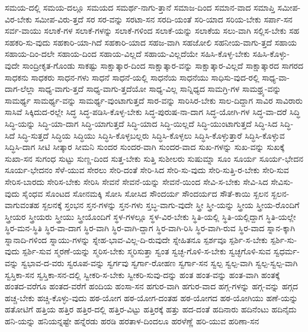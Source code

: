 {ಸಮಯ-ದಲ್ಲಿ
ಸಮಯ-ದಲ್ಲೂ
ಸಮಯದ
ಸಮರ್ಥ-ನಾಗು-ತ್ತಾನೆ
ಸಮಾಜ-ದಿಂದ
ಸಮಾನ-ವಾದ
ಸಮಾಪ್ತಿ
ಸಮೀಪ-ವಿರ-ಬೇಕು
ಸಮೀಪ-ವಿರು-ತ್ತದೆ
ಸರ
ಸರ-ವನ್ನು
ಸರಟಾ-ಸನ
ಸರದಿ-ಯಂತೆ
ಸರಿ-ಯಾದ
ಸರಿಯ-ಬೇಕು
ಸರ್ಪಾ-ಸನ
ಸರ್ವ-ವಾಯು
ಸಲಾಕೆ-ಗಳ
ಸಲಾಕೆ-ಗಳನ್ನು
ಸಲಾಕೆ-ಗಳಿಂದ
ಸಲಾಕೆ-ಯನ್ನು
ಸಲಾಕೆಯ
ಸಲು-ವಾಗಿ
ಸಲ್ಲಿಸ-ಬೇಕು
ಸಹ
ಸಹಕರಿ-ಸು-ವುದು
ಸಹಕಾರಿ-ಯಾ-ಗಿದೆ
ಸಹಕಾರಿ-ಯಾದ
ಸಹಜ-ವಾಗಿ
ಸಹಜೋಲಿ
ಸಹನೀಯ-ವಾಗು-ತ್ತದೆ
ಸಹಾಯ
ಸಹಾಯ-ದಿಂ-ದಲೇ
ಸಹಾಯ-ದಿಂದ
ಸಹಾಯ-ವಿಲ್ಲದೆ
ಸಹಾಯ-ವಿಲ್ಲದೆಯೇ
ಸಹಿಸಿ-ಕೊಳ್ಳ-ಬೇಕು
ಸಹಿಸಿ-ಕೊಳ್ಳು-ವುದೇ
ಸಾಂದ್ರೀಕೃತ-ಗೊಂಡು
ಸಾಕಷ್ಟು
ಸಾಕ್ಷಾತ್ಕಾರ-ದಿಂದ
ಸಾಕ್ಷಾತ್ಕಾರ-ವನ್ನು
ಸಾಕ್ಷಾತ್ಕಾರ-ವಿಲ್ಲದೆ
ಸಾಕ್ಷಾತ್ಕಾರದ
ಸಾಗರದ
ಸಾಧಕನು
ಸಾಧಕರು
ಸಾಧನ-ಗಳು
ಸಾಧನೆ
ಸಾಧನೆ-ಯಲ್ಲಿ
ಸಾಧನೆಯ
ಸಾಧನೆಯು
ಸಾಧಿಸು-ವುದ-ರಲ್ಲಿ
ಸಾಧ್ಯ-ವಾ-ದಾಗ-ಲೆಲ್ಲಾ
ಸಾಧ್ಯ-ವಾಗು-ತ್ತದೆ
ಸಾಧ್ಯ-ವಾಗು-ತ್ತದೆಯೋ
ಸಾಧ್ಯ-ವಿಲ್ಲ
ಸಾನ್ನಿಧ್ಯದ
ಸಾಮಗ್ರಿ-ಗಳ
ಸಾಮಥ್ರ್ಯ-ವನ್ನು
ಸಾಮರ್ಥ್ಯ
ಸಾಮರ್ಥ್ಯ-ವನ್ನು
ಸಾಮರ್ಥ್ಯ-ವುಂಟಾಗುತ್ತದೆ
ಸಾರ-ವನ್ನು
ಸಾರಿಸಿರ-ಬೇಕು
ಸಾಲ-ದಿದ್ದಾಗ
ಸಾವಿರ
ಸಾವಿರಾರು
ಸಾಸಿವೆ
ಸಿಕ್ಕಿದುದ-ರಲ್ಲೇ
ಸಿದ್ಧ
ಸಿದ್ಧ-ಪಡಿಸಿ-ಕೊಳ್ಳ-ಬೇಕು
ಸಿದ್ಧ-ಪುರುಷ-ನಾ-ದಾಗ
ಸಿದ್ಧ-ಯೋಗಿ-ಗಳ
ಸಿದ್ಧ-ವಾ-ದರೆ
ಸಿದ್ಧಿ
ಸಿದ್ಧಿ-ಯನ್ನು
ಸಿದ್ಧಿ-ಯಾ-ದಾಗ
ಸಿದ್ಧಿ-ಯಾಗುತ್ತದೆ
ಸಿದ್ಧಿ-ಯಾದ
ಸಿದ್ಧಿ-ಯಿಲ್ಲದೆ
ಸಿದ್ಧಿ-ಯುಂಟಾಗುತ್ತದೆ
ಸಿದ್ಧಿ-ಸಿದ
ಸಿದ್ಧಿ-ಸಿದೆ
ಸಿದ್ಧಿ-ಸುತ್ತದೆ
ಸಿದ್ಧಿಯ
ಸಿದ್ಧಿಯು
ಸಿದ್ಧಿಸಿ-ಕೊಳ್ಳಬಲ್ಲರು
ಸಿದ್ಧಿಸಿ-ಕೊಳ್ಳಲು
ಸಿದ್ಧಿಸಿ-ಕೊಳ್ಳುತ್ತಾರೆ
ಸಿದ್ಧಿಸಿ-ಕೊಳ್ಳುವ
ಸಿದ್ಧಿಸಿ-ದಾಗ
ಸೀಟಿ
ಸೀತ್ಕಾರ
ಸೀಮನಿ
ಸುಂದರ
ಸುಂದರ-ವಾಗಿ
ಸುಂದರ-ವಾದ
ಸುಖ-ಗಳನ್ನು
ಸುಖ-ವನ್ನು
ಸುಖಕ್ಕೆ
ಸುಖಾ-ಸನ
ಸುಗಂಧ
ಸುಟ್ಟು
ಸುಣ್ಣ-ದಿಂದ
ಸುತ್ತ-ಬೇಕು
ಸುತ್ತಿ
ಸುಶೀಲರು
ಸುಷುಮ್ನಾ
ಸೂಂ
ಸೂರ್ಯ
ಸೂರ್ಯ-ಭೇದನ
ಸೂರ್ಯ-ಭೇದನಂ
ಸೆಳೆ-ಯುವ
ಸೇರಲು
ಸೇರಿ-ದಂತೆ
ಸೇರಿ-ಸಿದ
ಸೇರಿ-ಸು-ವುದು
ಸೇರಿ-ಸುತ್ತಿ-ರ-ಬೇಕು
ಸೇರಿ-ಸುವ
ಸೇರಿಸ-ಬಾರದು
ಸೇರಿಸ-ಬೇಕು
ಸೇರಿಸಿ
ಸೇವನೆ
ಸೇವನೆ-ಯನ್ನು
ಸೇವನೆ-ಯಿಂದ
ಸೇವಿ-ಸ-ಬೇಕು
ಸೇವಿ-ಸಿದ
ಸೇವಿಸು-ವುದು
ಸೈಂಧವ
ಸೊಂಟದ
ಸೋನಮಕ್ಕಿ
ಸೋಸಿ
ಸೋಸಿದ
ಸೌಂದರ್ಯ
ಸೌಂದರ್ಯದ
ಸೌತೆ-ಕಾಯಿ
ಸ್ಖಲನ
ಸ್ಖಲನ-ವಾಗುವಂತಹ
ಸ್ಖಲನಕ್ಕೆ
ಸ್ತಂಭನ
ಸ್ತನ-ಗಳನ್ನು
ಸ್ತನ-ಗಳು
ಸ್ತಬ್ಧ-ವಾಗು-ವುದೇ
ಸ್ತ್ರೀ
ಸ್ತ್ರೀ-ಯನ್ನು
ಸ್ತ್ರೀಯ
ಸ್ತ್ರೀಯ-ರೊಂದಿಗೆ
ಸ್ತ್ರೀಯರ
ಸ್ತ್ರೀಯರು
ಸ್ತ್ರೀಯು
ಸ್ತ್ರೀಯೊಂದಿಗೆ
ಸ್ಥಳ-ಗಳಲ್ಲೂ
ಸ್ಥಳ-ವಿರ-ಬೇಕು
ಸ್ಥಿತಿ-ಯಲ್ಲಿ
ಸ್ಥಿತಿ-ಯಲ್ಲಿದ್ದಾಗ
ಸ್ಥಿತಿ-ಯಲ್ಲೇ
ಸ್ಥಿರ-ಮನ-ಸ್ಥಿತಿ
ಸ್ಥಿರ-ವಾ-ದಾಗ
ಸ್ಥಿರ-ವಾಗಿ
ಸ್ಥಿರ-ವಾಗಿ-ದ್ದಾಗ
ಸ್ಥಿರ-ವಾಗಿ-ರಿಸಿ
ಸ್ಥಿರ-ವಾಗಿ-ರುವ
ಸ್ಥಿರ-ವಾದ
ಸ್ನಾನ-ಕ್ಕಾಗಿ
ಸ್ನಾನಾದಿ-ಗಳಿಂದ
ಸ್ನಾಯು-ಗಳನ್ನು
ಸ್ನೇಹ-ಭಾವ-ವಿಲ್ಲ-ದಿ-ರುವುದೇ
ಸ್ನೇಹಿತನೂ
ಸ್ಪರ್ಶವೂ
ಸ್ಪರ್ಶಿ-ಸ-ಬೇಕು
ಸ್ಪರ್ಶಿ-ಸು-ವುದು
ಸ್ಪರ್ಶಿ-ಸುವ
ಸ್ಮರಣೆ-ಯನ್ನು
ಸ್ಮರಿಸ-ಬೇಕು
ಸ್ಮರಿಸುತ್ತಾ
ಸ್ವಂತ
ಸ್ವಚ್ಛ-ಗೊಳಿ-ಸ-ಬೇಕು
ಸ್ವಚ್ಛಗೊಳಿ-ಸುವ
ಸ್ವಧರ್ಮ-ವನ್ನು
ಸ್ವಭಾವ-ದ-ವರು
ಸ್ವರೂಪ-ವನ್ನು
ಸ್ವರ್ಗವು
ಸ್ವರ್ಗಾ-ರೋಹಣ
ಸ್ವರ್ಗಾ-ಸನ
ಸ್ವಲ್ಪ
ಸ್ವಲ್ಪ-ವಾಗಿ
ಸ್ವಲ್ಪ-ಸ್ವಲ್ಪ-ವಾಗಿ
ಸ್ವಸ್ತಿಕಾ-ಸನ
ಸ್ವಸ್ತಿಕಾ-ಸನ-ದಲ್ಲಿ
ಸ್ವೀಕರಿ-ಸ-ಬೇಕು
ಸ್ವೀಕರಿ-ಸುವು-ದನ್ನು
ಹಂತ
ಹಂತ-ವನ್ನು
ಹಂತ-ವಾಗಿ
ಹಂತಕ್ಕೆ
ಹಂತದ-ವರೆಗೂ
ಹಂತದ-ವರೆಗೆ
ಹಂದಿಯ
ಹಂಸಾ-ಸನ
ಹಗುರ-ವಾಗಿ
ಹಗುರ-ವಾದ
ಹಗ್ಗ-ಗಳನ್ನು
ಹಗ್ಗ-ವನ್ನು
ಹಗ್ಗದ
ಹಚ್ಚ-ಬೇಕು
ಹಚ್ಚಿ-ಕೊಳ್ಳು-ವುದು
ಹಠ-ಯೋಗ
ಹಠ-ಯೋಗ-ದಂತಹ
ಹಠ-ಯೋಗದ
ಹಠ-ಯೋಗಿಯು
ಹಣೆ-ಯನ್ನು
ಹತೋಟಿಗೆ
ಹತ್ತಿಯ
ಹತ್ತಿರ
ಹತ್ತಿರ-ದಲ್ಲಿ
ಹತ್ತಿರ-ವಿಟ್ಟು
ಹತ್ತಿರಕ್ಕೆ
ಹತ್ತು
ಹದ-ದಂತೆ
ಹದಿನಾರು
ಹದಿನೆಂಟು
ಹದಿನೈದು
ಹನಿ-ಯನ್ನು
ಹನಿಯನ್ನಷ್ಟೇ
ಹನ್ನೆರಡು
ಹರಡಿ
ಹರತಾಳ-ದಿಂದಲೂ
ಹರಳೆಣ್ಣೆ
ಹರಿ-ಯುವ
ಹರಿಣಾ-ಸನ
}
